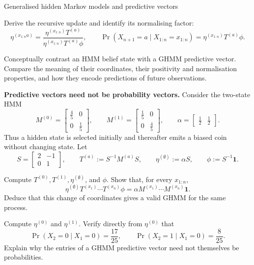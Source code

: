 \begin{exercise}[Extension]{Generalised hidden Markov models and predictive vectors}
\begin{parts}
\begin{subparts}
        \item Derive the recursive update and identify its normalising
          factor:
          \[
            \eta^{(x_{1:n}a)}
              =\frac{\eta^{(x_{1:n})}T^{(a)}}
                {\eta^{(x_{1:n})}T^{(a)}\phi},
            \qquad
            \Pr(X_{n+1}=a\mid X_{1:n}=x_{1:n})
              =\eta^{(x_{1:n})}T^{(a)}\phi.
          \]

        \item Conceptually contrast an HMM belief state with a GHMM
          predictive vector. Compare the meaning of their coordinates, their
          positivity and normalisation properties, and how they encode
          predictions of future observations.
      \end{subparts}

    \item \textbf{Predictive vectors need not be probability vectors.}
      Consider the two-state HMM
      \[
        M^{(0)}=
          \begin{bmatrix}\tfrac45&0\\0&\tfrac15\end{bmatrix},
        \qquad
        M^{(1)}=
          \begin{bmatrix}\tfrac15&0\\0&\tfrac45\end{bmatrix},
        \qquad
        \alpha=\begin{bmatrix}\tfrac12&\tfrac12\end{bmatrix}.
      \]
      Thus a hidden state is selected initially and thereafter emits a biased
      coin without changing state. Let
      \[
        S=\begin{bmatrix}2&-1\\0&1\end{bmatrix},
        \qquad
        T^{(a)}:=S^{-1}M^{(a)}S,\qquad
        \eta^{(\emptyset)}:=\alpha S,\qquad
        \phi:=S^{-1}\mathbf 1.
      \]
      \begin{subparts}
        \item Compute $T^{(0)},T^{(1)},\eta^{(\emptyset)}$, and $\phi$.
          Show that, for every $x_{1:n}$,
          \[
            \eta^{(\emptyset)}
              T^{(x_1)}\cdots T^{(x_n)}\phi
              =
            \alpha M^{(x_1)}\cdots M^{(x_n)}\mathbf 1.
          \]
          Deduce that this change of coordinates gives a valid GHMM for the
          same process.

        \item Compute $\eta^{(0)}$ and $\eta^{(1)}$. Verify directly from
          $\eta^{(0)}$ that
          \[
            \Pr(X_2=0\mid X_1=0)=\frac{17}{25},
            \qquad
            \Pr(X_2=1\mid X_1=0)=\frac8{25}.
          \]
          Explain why the entries of a GHMM predictive vector need not
          themselves be probabilities.
      \end{subparts}


\end{parts}
\end{exercise}
